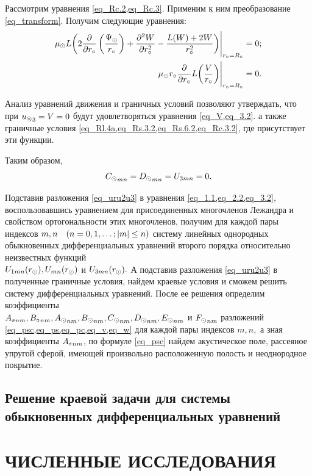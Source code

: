Рассмотрим уравнения \cref{eq_Rc.2,eq_Rc.3}. Применим к ним преобразование \cref{eq_transform}. Получим следующие уравнения:
\begin{align}
\mu\s L\!\left(2\fr{\de}{\de r\c}\left(\fr{\P\s}{r\c}\right) + \fr{\de^2 W}{\de r\c^2} - \fr{L(W) + 2W}{r\c^2}\right)&\Biggr|_{r\c=R\c}=0;\label{eq_Rc.2.2}\\
\mu\s r\c\fr{\de}{\de r\c}L\!\left(\fr{V}{r\c}\right)&\Biggr|_{r\c=R\c} = 0.\label{eq_Rc.3.2}
\end{align}

Анализ уравнений движения и граничных условий позволяют утверждать, что при ${u\l}_3 = V = 0$ будут удовлетворяться уравнения \cref{eq_V,eq_3.2}. а также граничные условия \cref{eq_Rl.4a,eq_Rs.3.2,eq_Rs.6.2,eq_Rc.3.2}, где присутствует эти функции.

Таким образом, 
$$
{C\s}_{mn} = {D\s}_{mn} = U_{3mn} = 0.
$$

Подставив разложения \cref{eq_uru2u3} в уравнения \cref{eq_1.1,eq_2.2,eq_3.2}, воспользовавшись уравнением для присоединенных многочленов Лежандра и свойством ортогональности этих многочленов, получим для каждой пары индексов $m,n \q(n = 0,1,\ldots; \lvert m\rvert\leq n)$ систему линейных однородных обыкновенных дифференциальных уравнений второго порядка относительно неизвестных функций \\ $U_{1mn}(r\s), U_{mn}(r\s)$ и $U_{3mn}(r\s).$ А подставив разложения \cref{eq_uru2u3} в полученные граничные условия, найдем краевые условия и сможем решить  систему дифференциальных уравнений. После ее решения определим коэффициенты \\
${A\sc}_{nm}, {B\c}_{nm}, {A\s}_{nm}, {B\s}_{nm}, {C\s}_{nm}, {D\s}_{nm}, {E\s}_{nm}$ и $ {F\s}_{nm}$ разложений  \cref{eq_psc,eq_ps,eq_pc,eq_v,eq_w} для каждой пары индексов $m,n,$ а зная коэффициенты ${A\sc}_{nm}$, по формуле \cref{eq_psc} найдем акустическое поле, рассеяное упругой сферой, имеющей произвольно расположенную полость и неоднородное покрытие.

\newpage
\subsection{Решение краевой задачи для системы обыкновенных дифференциальных уравнений}

\newpage
\section{ЧИСЛЕННЫЕ ИССЛЕДОВАНИЯ}

